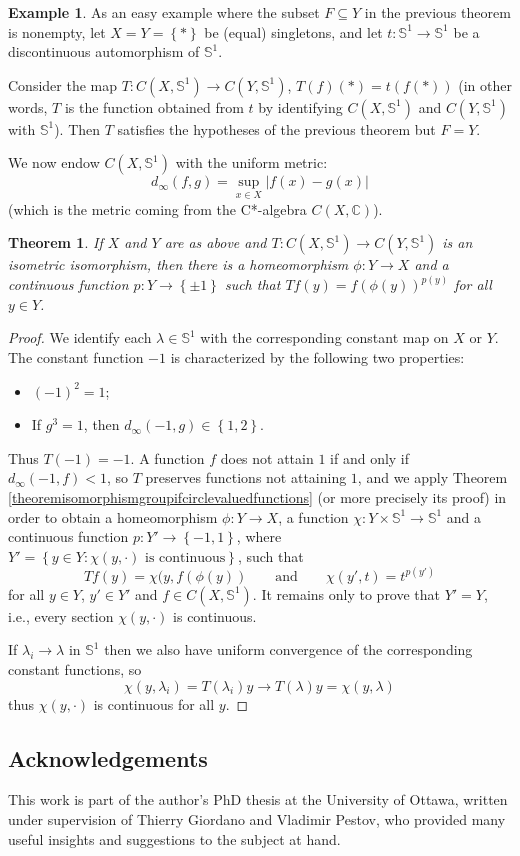 \documentclass[letter,11pt]{amsart}
\theoremstyle{plain}		\newtheorem{theorem}[generalnumbering]{Theorem}
\theoremstyle{plain}		\newtheorem{corollary}[generalnumbering]{Corollary}
\theoremstyle{definition}		\newtheorem{definition}[generalnumbering]{Definition}
\theoremstyle{definition}		\newtheorem{example}[generalnumbering]{Example}
\theoremstyle{plain}		\newtheorem{proposition}[generalnumbering]{Proposition}
\theoremstyle{plain}		\newtheorem{lemma}[generalnumbering]{Lemma}
\theoremstyle{definition}
\begin{document}
\begin{example}
	As an easy example where the subset $F\subseteq Y$ in the previous theorem is nonempty, let $X=Y=\left\{\ast\right\}$ be (equal) singletons, and let $t\colon\mathbb{S}^1\to\mathbb{S}^1$ be a discontinuous automorphism of $\mathbb{S}^1$.
	
	Consider the map $T\colon C(X,\mathbb{S}^1)\to C(Y,\mathbb{S}^1)$, $T(f)(\ast)=t(f(\ast))$ (in other words, $T$ is the function obtained from $t$ by identifying $C(X,\mathbb{S}^1)$ and $C(Y,\mathbb{S}^1)$ with $\mathbb{S}^1$). Then $T$ satisfies the hypotheses of the previous theorem but $F=Y$.
\end{example}

We now endow $C(X,\mathbb{S}^1)$ with the uniform metric:
\[d_\infty(f,g)=\sup_{x\in X}|f(x)-g(x)|\]
(which is the metric coming from the C*-algebra $C(X,\mathbb{C})$).

\begin{theorem}\label{theoremisometricisomorphismcirclegroups}
	If $X$ and $Y$ are as above and $T\colon C(X,\mathbb{S}^1)\to C(Y,\mathbb{S}^1)$ is an isometric isomorphism, then there is a homeomorphism $\phi\colon Y\to X$ and a continuous function $p\colon Y\to\left\{\pm 1\right\}$ such that $Tf(y)=f(\phi(y))^{p(y)}$ for all $y\in Y$.
\end{theorem}
\begin{proof}
	We identify each $\lambda\in\mathbb{S}^1$ with the corresponding constant map on $X$ or $Y$. The constant function $-1$ is characterized by the following two properties:
	\begin{itemize}
		\item $(-1)^2=1$;
		\item If $g^3=1$, then $d_\infty(-1,g)\in\left\{1,2\right\}$.
	\end{itemize}
	Thus $T(-1)=-1$. A function $f$ does not attain $1$ if and only if $d_\infty(-1,f)<1$, so $T$ preserves functions not attaining $1$, and we apply Theorem \ref{theoremisomorphismgroupifcirclevaluedfunctions} (or more precisely its proof) in order to obtain a homeomorphism $\phi\colon Y\to X$, a function $\chi\colon Y\times\mathbb{S}^1\to\mathbb{S}^1$ and a continuous function $p\colon Y'\to\left\{-1,1\right\}$, where $Y'=\left\{y\in Y:\chi(y,\cdot)\text{ is continuous}\right\}$, such that
	\[Tf(y)=\chi(y,f(\phi(y))\qquad\text{and}\qquad\chi(y',t)=t^{p(y')}\]
	for all $y\in Y$, $y'\in Y'$ and $f\in C(X,\mathbb{S}^1)$. It remains only to prove that $Y'=Y$, i.e., every section $\chi(y,\cdot)$ is continuous.
	
	If $\lambda_i\to\lambda$ in $\mathbb{S}^1$ then we also have uniform convergence of the corresponding constant functions, so
	\[\chi(y,\lambda_i)=T(\lambda_i)y\to T(\lambda)y=\chi(y,\lambda)\]
	thus $\chi(y,\cdot)$ is continuous for all $y$.
\end{proof}

\subsection*{Acknowledgements}
This work is part of the author's PhD thesis at the University of Ottawa, written under supervision of Thierry Giordano and Vladimir Pestov, who provided many useful insights and suggestions to the subject at hand.



\end{document}
